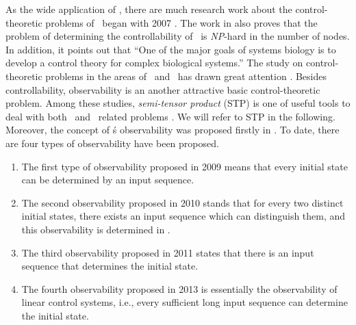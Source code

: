 As the wide application of \BCNs, there are much research work about the control-theoretic problems of \BCNs\ began with 2007 \cite{Akutsu2007Control}. The work in \cite{Akutsu2007Control} also proves that the problem of determining the controllability of \BCNs\ is {\em NP}-hard in the number of nodes. In addition, it points out that ``One of the major goals of systems biology is to develop a control theory for complex biological systems.'' The study on control-theoretic problems in the areas of \BNs\ and \BCNs\ has drawn great attention \cite{cheng2009controllability, Zhao2010Input, Cheng2011Identification, Cheng2011Analysis,Fornasini2013Observability}. Besides controllability, observability is an another  attractive basic control-theoretic problem.  Among these studies, \emph{semi-tensor product} (STP) is one of useful tools to deal with  both \BNs\ and \BCNs\  related problems \cite{cheng2009controllability}.  We will refer to STP in the following. Moreover,  the concept of \BCN\'s observability was proposed firstly in \cite{cheng2009controllability}. To date, there are four types of observability have been proposed. 
\begin{enumerate}
	\item The first type of observability proposed in 2009 \cite{cheng2009controllability} means that every initial state can be determined by an input sequence.
	
	\item 
	The second observability proposed in 2010 \cite{Zhao2010Input} stands that for every two distinct initial states, there exists an input sequence which can distinguish them, and this observability is determined in \cite{Li2015Controllability}.
	
	\item The third observability proposed in 2011 \cite{Cheng2011Identification} states that there is an input sequence that determines the initial state.
	
	\item  The fourth observability proposed in 2013 \cite{Fornasini2013Observability} is essentially the observability of linear control systems, i.e., every sufficient long input sequence can determine the initial state.
\end{enumerate}
 


